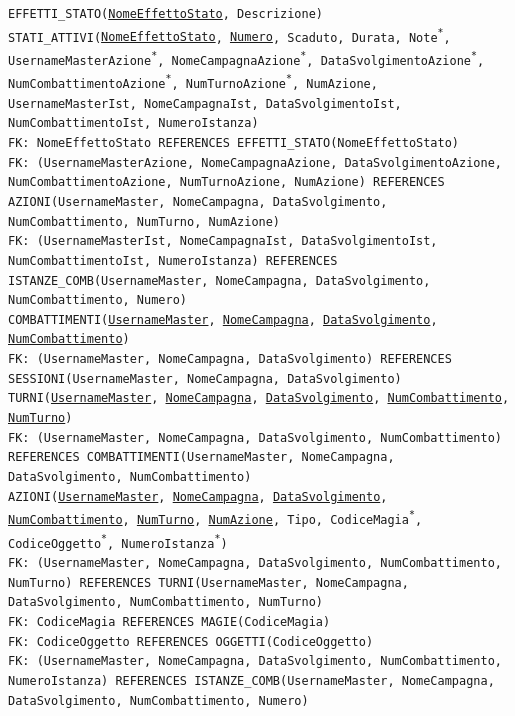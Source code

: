 \documentclass[a4paper,12pt]{report}
\begin{document}
\noindent \texttt{EFFETTI\_STATO(\underline{NomeEffettoStato}, Descrizione)} \\

\noindent \texttt{STATI\_ATTIVI(\underline{NomeEffettoStato}, \underline{Numero}, Scaduto, Durata, Note\textsuperscript{*}, UsernameMasterAzione\textsuperscript{*}, NomeCampagnaAzione\textsuperscript{*}, DataSvolgimentoAzione\textsuperscript{*}, NumCombattimentoAzione\textsuperscript{*}, NumTurnoAzione\textsuperscript{*}, NumAzione, UsernameMasterIst, NomeCampagnaIst, DataSvolgimentoIst, NumCombattimentoIst, NumeroIstanza)} \\
\texttt{FK: NomeEffettoStato REFERENCES EFFETTI\_STATO(NomeEffettoStato)} \\
\texttt{FK: (UsernameMasterAzione, NomeCampagnaAzione, DataSvolgimentoAzione, NumCombattimentoAzione, NumTurnoAzione, NumAzione) REFERENCES AZIONI(UsernameMaster, NomeCampagna, DataSvolgimento, NumCombattimento, NumTurno, NumAzione)} \\
\texttt{FK: (UsernameMasterIst, NomeCampagnaIst, DataSvolgimentoIst, NumCombattimentoIst, NumeroIstanza) REFERENCES ISTANZE\_COMB(UsernameMaster, NomeCampagna, DataSvolgimento, NumCombattimento, Numero)} \\

\noindent \texttt{COMBATTIMENTI(\underline{UsernameMaster}, \underline{NomeCampagna}, \underline{DataSvolgimento}, \underline{NumCombattimento})} \\
\texttt{FK: (UsernameMaster, NomeCampagna, DataSvolgimento) REFERENCES SESSIONI(UsernameMaster, NomeCampagna, DataSvolgimento)} \\

\noindent \texttt{TURNI(\underline{UsernameMaster}, \underline{NomeCampagna}, \underline{DataSvolgimento}, \underline{NumCombattimento}, \underline{NumTurno})} \\
\texttt{FK: (UsernameMaster, NomeCampagna, DataSvolgimento, NumCombattimento) REFERENCES COMBATTIMENTI(UsernameMaster, NomeCampagna, DataSvolgimento, NumCombattimento)} \\

\noindent \texttt{AZIONI(\underline{UsernameMaster}, \underline{NomeCampagna}, \underline{DataSvolgimento}, \underline{NumCombattimento}, \underline{NumTurno}, \underline{NumAzione}, Tipo, CodiceMagia\textsuperscript{*}, CodiceOggetto\textsuperscript{*}, NumeroIstanza\textsuperscript{*})} \\
\texttt{FK: (UsernameMaster, NomeCampagna, DataSvolgimento, NumCombattimento, NumTurno) REFERENCES TURNI(UsernameMaster, NomeCampagna, DataSvolgimento, NumCombattimento, NumTurno)} \\
\texttt{FK: CodiceMagia REFERENCES MAGIE(CodiceMagia)} \\
\texttt{FK: CodiceOggetto REFERENCES OGGETTI(CodiceOggetto)} \\
\texttt{FK: (UsernameMaster, NomeCampagna, DataSvolgimento, NumCombattimento, NumeroIstanza) REFERENCES ISTANZE\_COMB(UsernameMaster, NomeCampagna, DataSvolgimento, NumCombattimento, Numero)} \\
\end{document}
